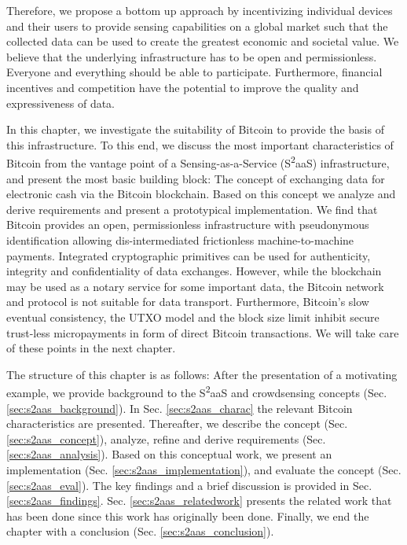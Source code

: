 Therefore, we propose a bottom up approach by incentivizing individual devices and their users to provide sensing capabilities on a global market such that the collected data can be used to create the greatest economic and societal value.
We believe that the underlying infrastructure has to be open and permissionless. Everyone and everything should be able to participate. Furthermore, financial incentives and competition have the potential to improve the quality and expressiveness of data. 

In this chapter, we investigate the suitability of Bitcoin to provide the basis of this infrastructure. To this end, we discuss the most important characteristics of Bitcoin from the vantage point of a Sensing-as-a-Service (S\textsuperscript{2}aaS) infrastructure, and present the most basic building block: The concept of exchanging data for electronic cash via the Bitcoin blockchain. Based on this concept we analyze and derive requirements and present a prototypical implementation. We find that Bitcoin provides an open, permissionless infrastructure with pseudonymous identification allowing dis-intermediated frictionless machine-to-machine payments. Integrated cryptographic primitives can be used for authenticity, integrity and confidentiality of data exchanges. However, while the blockchain may be used as a notary service for some important data, the Bitcoin network and protocol is not suitable for data transport. Furthermore, Bitcoin's slow eventual consistency, the \ac{UTXO} model and the block size limit inhibit secure trust-less micropayments in form of direct Bitcoin transactions. We will take care of these points in the next chapter. 

The structure of this chapter is as follows: After the presentation of a motivating example, we provide background to the S\textsuperscript{2}aaS and crowdsensing concepts (Sec. \ref{sec:s2aas_background}). In Sec. \ref{sec:s2aas_charac} the relevant Bitcoin characteristics are presented. Thereafter, we describe the concept (Sec. \ref{sec:s2aas_concept}), analyze, refine and derive requirements (Sec. \ref{sec:s2aas_analysis}). Based on this conceptual work, we present an implementation (Sec. \ref{sec:s2aas_implementation}), and evaluate the concept (Sec. \ref{sec:s2aas_eval}). The key findings and a brief discussion is provided in Sec. \ref{sec:s2aas_findings}. Sec. \ref{sec:s2aas_relatedwork} presents the related work that has been done since this work has originally been done. Finally, we end the chapter with a conclusion (Sec. \ref{sec:s2aas_conclusion}).

